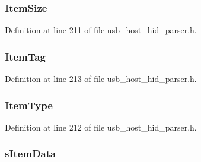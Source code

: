 \subsubsection[{Item\+Size}]{ Item\+Size}\label{struct___h_i_d___i_t_e_m___i_n_f_o_aaf0f74e266d95f2ea6d5d563b59aad40}


Definition at line 211 of file usb\+\_\+host\+\_\+hid\+\_\+parser.\+h.

\hypertarget{struct___h_i_d___i_t_e_m___i_n_f_o_a3efd051d2bb790b9eb93426966fd12ff}{}
\subsubsection[{Item\+Tag}]{ Item\+Tag}\label{struct___h_i_d___i_t_e_m___i_n_f_o_a3efd051d2bb790b9eb93426966fd12ff}


Definition at line 213 of file usb\+\_\+host\+\_\+hid\+\_\+parser.\+h.

\hypertarget{struct___h_i_d___i_t_e_m___i_n_f_o_a7dca8297adff54a962a670360d023ce7}{}
\subsubsection[{Item\+Type}]{ Item\+Type}\label{struct___h_i_d___i_t_e_m___i_n_f_o_a7dca8297adff54a962a670360d023ce7}


Definition at line 212 of file usb\+\_\+host\+\_\+hid\+\_\+parser.\+h.

\hypertarget{struct___h_i_d___i_t_e_m___i_n_f_o_a2aa105276c0a0071288e43b964397dde}{}
\subsubsection[{s\+Item\+Data}]{ s\+Item\+Data}\label{struct___h_i_d___i_t_e_m___i_n_f_o_a2aa105276c0a0071288e43b964397dde}


